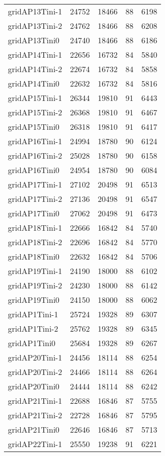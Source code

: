 \begin{longtable}{lrrrr}
gridAP13Tini-1 & 24752 & 18466 & 88 & 6198 \\
gridAP13Tini-2 & 24762 & 18466 & 88 & 6208 \\
gridAP13Tini0 & 24740 & 18466 & 88 & 6186 \\
gridAP14Tini-1 & 22656 & 16732 & 84 & 5840 \\
gridAP14Tini-2 & 22674 & 16732 & 84 & 5858 \\
gridAP14Tini0 & 22632 & 16732 & 84 & 5816 \\
gridAP15Tini-1 & 26344 & 19810 & 91 & 6443 \\
gridAP15Tini-2 & 26368 & 19810 & 91 & 6467 \\
gridAP15Tini0 & 26318 & 19810 & 91 & 6417 \\
gridAP16Tini-1 & 24994 & 18780 & 90 & 6124 \\
gridAP16Tini-2 & 25028 & 18780 & 90 & 6158 \\
gridAP16Tini0 & 24954 & 18780 & 90 & 6084 \\
gridAP17Tini-1 & 27102 & 20498 & 91 & 6513 \\
gridAP17Tini-2 & 27136 & 20498 & 91 & 6547 \\
gridAP17Tini0 & 27062 & 20498 & 91 & 6473 \\
gridAP18Tini-1 & 22666 & 16842 & 84 & 5740 \\
gridAP18Tini-2 & 22696 & 16842 & 84 & 5770 \\
gridAP18Tini0 & 22632 & 16842 & 84 & 5706 \\
gridAP19Tini-1 & 24190 & 18000 & 88 & 6102 \\
gridAP19Tini-2 & 24230 & 18000 & 88 & 6142 \\
gridAP19Tini0 & 24150 & 18000 & 88 & 6062 \\
gridAP1Tini-1 & 25724 & 19328 & 89 & 6307 \\
gridAP1Tini-2 & 25762 & 19328 & 89 & 6345 \\
gridAP1Tini0 & 25684 & 19328 & 89 & 6267 \\
gridAP20Tini-1 & 24456 & 18114 & 88 & 6254 \\
gridAP20Tini-2 & 24466 & 18114 & 88 & 6264 \\
gridAP20Tini0 & 24444 & 18114 & 88 & 6242 \\
gridAP21Tini-1 & 22688 & 16846 & 87 & 5755 \\
gridAP21Tini-2 & 22728 & 16846 & 87 & 5795 \\
gridAP21Tini0 & 22646 & 16846 & 87 & 5713 \\
gridAP22Tini-1 & 25550 & 19238 & 91 & 6221 \\

\end{longtable}
